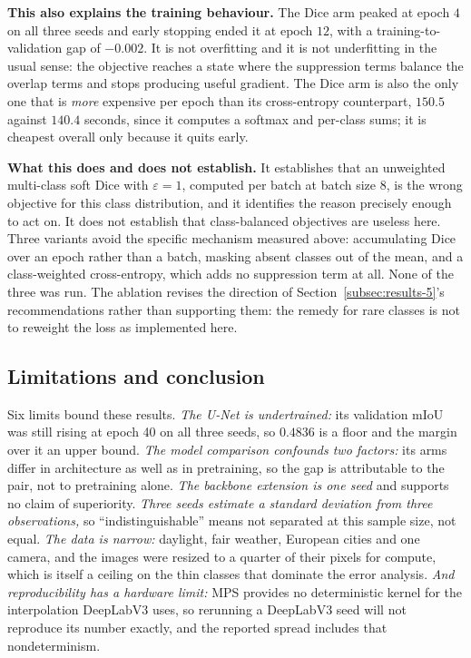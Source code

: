 \textbf{This also explains the training behaviour.} The Dice arm peaked at epoch $4$ on all three
seeds and early stopping ended it at epoch $12$, with a training-to-validation gap of $-0.002$.
It is not overfitting and it is not underfitting in the usual sense: the objective reaches a
state where the suppression terms balance the overlap terms and stops producing useful gradient.
The Dice arm is also the only one that is \emph{more} expensive per epoch than its
cross-entropy counterpart, $150.5$ against $140.4$ seconds, since it computes a softmax and
per-class sums; it is cheapest overall only because it quits early.

\textbf{What this does and does not establish.} It establishes that an unweighted multi-class
soft Dice with $\varepsilon = 1$, computed per batch at batch size 8, is the wrong objective for
this class distribution, and it identifies the reason precisely enough to act on. It does not
establish that class-balanced objectives are useless here. Three variants avoid the specific
mechanism measured above: accumulating Dice over an epoch rather than a batch, masking absent
classes out of the mean, and a class-weighted cross-entropy, which adds no suppression term at
all. None of the three was run. The ablation revises the direction of
Section~\ref{subsec:results-5}'s recommendations rather than supporting them: the remedy for
rare classes is not to reweight the loss as implemented here.

\subsection{Limitations and conclusion}
\label{subsec:results-7}

Six limits bound these results. \emph{The U-Net is undertrained:} its validation mIoU was still
rising at epoch 40 on all three seeds, so $0.4836$ is a floor and the margin over it an upper
bound. \emph{The model comparison confounds two factors:} its arms differ in architecture as
well as in pretraining, so the gap is attributable to the pair, not to pretraining alone.
\emph{The backbone extension is one seed} and supports no claim of superiority. \emph{Three seeds estimate a standard deviation from
three observations,} so ``indistinguishable'' means not separated at this sample size, not equal.
\emph{The data is narrow:} daylight, fair weather, European cities and one camera, and the images
were resized to a quarter of their pixels for compute, which is itself a ceiling on the thin
classes that dominate the error analysis. \emph{And reproducibility has a hardware limit:} MPS
provides no deterministic kernel for the interpolation DeepLabV3 uses, so rerunning a DeepLabV3
seed will not reproduce its number exactly, and the reported spread includes that
nondeterminism.

